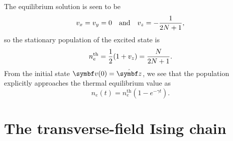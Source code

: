 \documentclass[../thesis.tex]{subfiles}
\begin{document}
The equilibrium solution is seen to be
\begin{equation}
  v_x
  = v_y
  = 0
  \qand
  v_z
  = -\frac{1}{2N + 1},
\end{equation}
so the stationary population of the excited state is
\begin{equation}
  n_e^\text{th}
  = \frac{1}{2}\qty(1 + v_z)
  = \frac{N}{2N + 1}.
\end{equation}
From the initial state $\vq{v}(0) = \vu{z}$, we see that the population
explicitly approaches the thermal equilibrium value as
\begin{equation}
  n_e(t)
  = n_e^\text{th}(1 - e^{-\gamma t}).
\end{equation}


\section{The transverse-field Ising chain}
\end{document}
